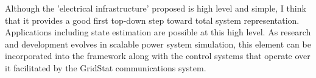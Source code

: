 \documentclass{article}
\begin{document}
Although the 'electrical infrastructure' proposed is high level and simple, I think 
that it provides a good first top-down step toward total system representation. 
Applications including state estimation are possible at this high level.  As 
research and development evolves in scalable power system simulation, this element 
can be incorporated into the framework along with the control systems that operate
over it facilitated by the GridStat communications system.
\end{document}
